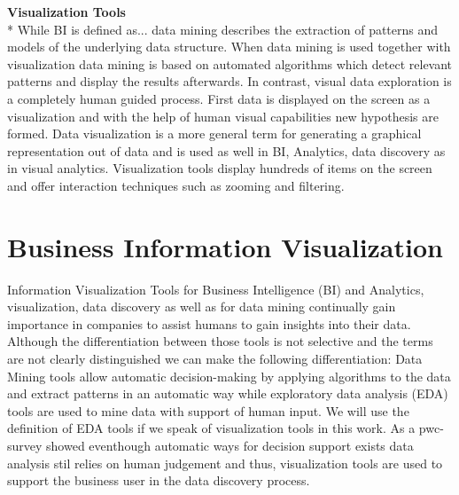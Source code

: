 \textbf{Visualization Tools}\\*
While BI is defined as... data mining describes the extraction of patterns and models of the underlying data structure\cite{FerreiradeOliveira2003}. When data mining is used together with visualization data mining is based on automated algorithms which detect relevant patterns and display the results afterwards. In contrast, visual data exploration is a completely human guided process\cite{FerreiradeOliveira2003}. First data is displayed on the screen as a visualization and with the help of human visual capabilities new hypothesis are formed. Data visualization is a more general term for generating a graphical representation out of data and is used as well in BI, Analytics, data discovery as in visual analytics. 
Visualization tools display hundreds of items on the screen and offer interaction techniques such as zooming and filtering\cite{Shneiderman2008}.

\section{Business Information Visualization}\label{BIV}
Information Visualization 
Tools for Business Intelligence (BI) and Analytics, visualization, data discovery as well as for data mining continually gain importance in companies to assist humans to gain insights into their data. Although the differentiation between those tools is not selective and the terms are not clearly distinguished we can make the following differentiation: Data Mining tools allow automatic decision-making by applying algorithms to the data and extract patterns in an automatic way\cite{Goebel1999} while exploratory data analysis (EDA) tools are used to mine data with support of human input. We will use the definition of EDA tools if we speak of visualization tools in this work. As a pwc-survey showed eventhough automatic ways for decision support exists data analysis stil relies on human judgement and thus\cite{PwC2016}, visualization tools are used to support the business user in the data discovery process.

